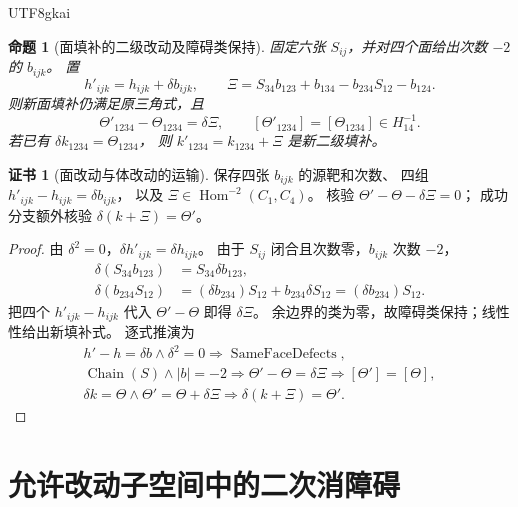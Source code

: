 \documentclass[12pt,a4paper,openany,notitlepage]{report}
\theoremstyle{plain}
\newtheorem{proposition}[theorem]{命题}
\theoremstyle{definition}
\newtheorem*{certificate}{证书}
\theoremstyle{remark}
\begin{document}
\begin{CJK*}{UTF8}{gkai}
\begin{proposition}[面填补的二级改动及障碍类保持]
\label{exp:hom:secondary-invariance}
固定六张 $S_{ij}$，并对四个面给出次数 $-2$ 的 $b_{ijk}$。
置
\[
 h'_{ijk}=h_{ijk}+\delta b_{ijk},\qquad
 \Xi=S_{34}b_{123}+b_{134}-b_{234}S_{12}-b_{124}.
\]
则新面填补仍满足原三角式，且
\[
 \Theta'_{1234}-\Theta_{1234}=\delta\Xi,
 \qquad [\Theta'_{1234}]=[\Theta_{1234}]\in H^{-1}_{14}.
\]
若已有 $\delta k_{1234}=\Theta_{1234}$，
则 $k'_{1234}=k_{1234}+\Xi$ 是新二级填补。
\end{proposition}
\begin{certificate}[面改动与体改动的运输]
保存四张 $b_{ijk}$ 的源靶和次数、
四组 $h'_{ijk}-h_{ijk}=\delta b_{ijk}$，
以及 $\Xi\in\operatorname{Hom}^{-2}(C_1,C_4)$。
核验 $\Theta'-\Theta-\delta\Xi=0$；
成功分支额外核验 $\delta(k+\Xi)=\Theta'$。
\end{certificate}
\begin{proof}
由 $\delta^2=0$，$\delta h'_{ijk}=\delta h_{ijk}$。
由于 $S_{ij}$ 闭合且次数零，$b_{ijk}$ 次数 $-2$，
\[
 \begin{aligned}
 \delta(S_{34}b_{123})&=S_{34}\delta b_{123},\\
 \delta(b_{234}S_{12})&=(\delta b_{234})S_{12}
                       +b_{234}\delta S_{12}
                      =(\delta b_{234})S_{12}.
 \end{aligned}
\]
把四个 $h'_{ijk}-h_{ijk}$ 代入 $\Theta'-\Theta$ 即得 $\delta\Xi$。
余边界的类为零，故障碍类保持；线性性给出新填补式。
逐式推演为
\[
 \begin{gathered}
 h'-h=\delta b\land\delta^2=0
 \Rightarrow\operatorname{SameFaceDefects},\\
 \operatorname{Chain}(S)\land|b|=-2
 \Rightarrow\Theta'-\Theta=\delta\Xi
 \Rightarrow[\Theta']=[\Theta],\\
 \delta k=\Theta\land\Theta'=\Theta+\delta\Xi
 \Rightarrow\delta(k+\Xi)=\Theta'.
 \end{gathered}
\]
\end{proof}

\section{允许改动子空间中的二次消障碍}
\label{exp:hom:allowed-face-variations}


\end{CJK*}
\end{document}
